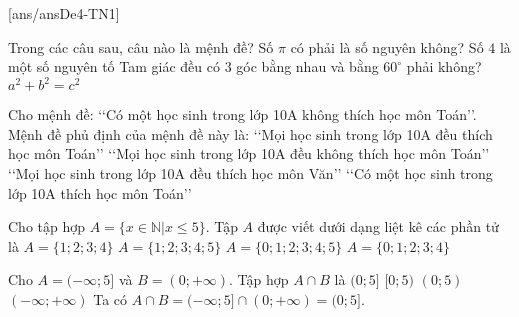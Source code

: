﻿\begin{name}
	{\tenchude}
	{\tendethi}
	{\tentruong}
	{\thoigian}
\end{name}
\setcounter{ex}{0}\setcounter{bt}{0}
\TN
{}[ans/ansDe4-TN1]
\begin{ex}%
Trong các câu sau, câu nào là mệnh đề?
\choice
{Số $\pi $ có phải là số nguyên không?}
{\True Số $4 $ là một số nguyên tố}
{Tam giác đều  có $3$ góc bằng nhau và bằng $60^\circ$ phải không?}
{$a^2+b^2=c^2 $}
\end{ex}

\begin{ex}%
Cho mệnh đề: \lq\lq Có một học sinh trong lớp 10A không thích học môn Toán\rq\rq. Mệnh đề phủ định của mệnh đề này là:
\choice
{\True \lq\lq Mọi học sinh trong lớp 10A đều thích học môn Toán\rq\rq}
{\lq\lq Mọi học sinh trong lớp 10A đều không thích học môn Toán\rq\rq}
{\lq\lq Mọi học sinh trong lớp 10A đều thích học môn Văn\rq\rq}
{\lq\lq Có một học sinh trong lớp 10A thích học môn Toán\rq\rq}
\end{ex}

\begin{ex}%
Cho tập hợp $A=\{x\in \mathbb{N}|x\leq 5\}$. Tập $A$ được viết dưới dạng liệt kê các phần tử là
\choice
{$A=\{1;2;3;4\}$}
{$A=\{1;2;3;4;5\}$}
{\True $A=\{0;1;2;3;4;5\}$}
{$A=\{0;1;2;3;4\}$}
\end{ex}

\begin{ex}%
Cho $A=(-\infty;5]$ và $B=(0;+\infty)$. Tập hợp $A\cap B$ là
\choice
{\True $(0;5]$}
{$[0;5)$}
{$(0;5)$}
{$(-\infty;+\infty)$}
\loigiai
{
Ta có $A\cap B = (-\infty;5]\cap (0;+\infty) = (0;5]$.
}
\end{ex}

